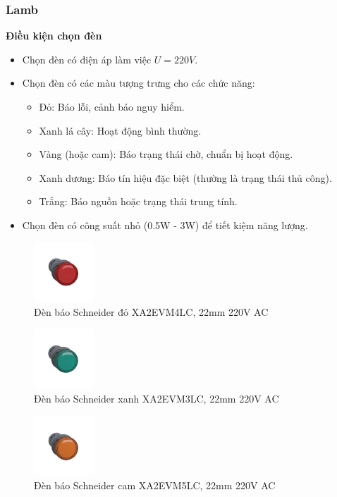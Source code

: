         \subsubsection{Lamb}
            \textbf{Điều kiện chọn đèn}
                \begin{itemize}
                    \item Chọn đèn có điện áp làm việc $U = 220V$.
                    \item Chọn đèn có các màu tượng trưng cho các chức năng:
                        \begin{itemize}
                            \item Đỏ: Báo lỗi, cảnh báo nguy hiểm.
                            \item Xanh lá cây: Hoạt động bình thường.
                            \item Vàng (hoặc cam): Báo trạng thái chờ, chuẩn bị hoạt động.
                            \item Xanh dương: Báo tín hiệu đặc biệt (thường là trạng thái thủ công).
                            \item Trắng: Báo nguồn hoặc trạng thái trung tính.
                        \end{itemize}
                    \item Chọn đèn có công suất nhỏ (0.5W - 3W) để tiết kiệm năng lượng.
                \end{itemize}
            \begin{figure}[H]
                \centering
                \includegraphics[width=0.2\textwidth]{pictures/2i.png}
                \caption{Đèn báo Schneider đỏ XA2EVM4LC, 22mm 220V AC}
            \end{figure}
            \begin{figure}[H]
                \centering
                \includegraphics[width=0.2\textwidth]{pictures/2j.png}
                \caption{Đèn báo Schneider xanh XA2EVM3LC, 22mm 220V AC}
            \end{figure}
            \begin{figure}[H]
                \centering
                \includegraphics[width=0.2\textwidth]{pictures/2k.png}
                \caption{Đèn báo Schneider cam XA2EVM5LC, 22mm 220V AC}
            \end{figure}
